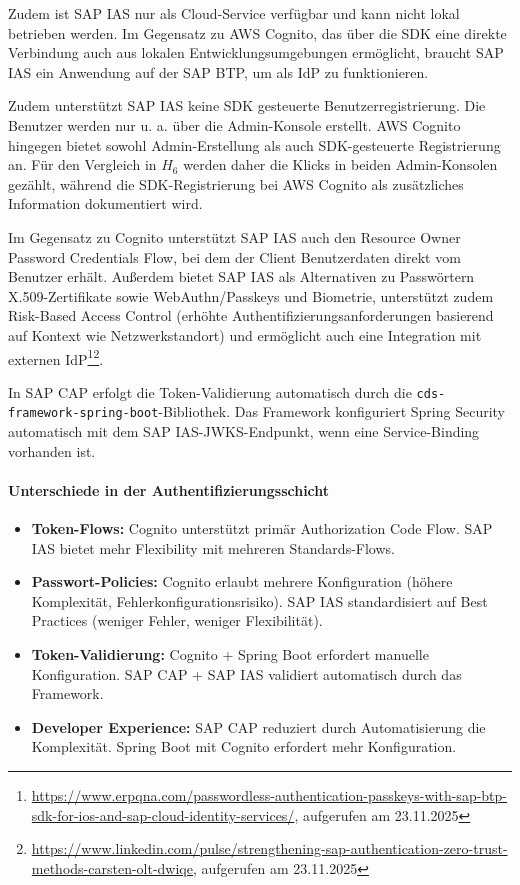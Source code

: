 Zudem ist \ac{SAP IAS} nur als Cloud-Service verfügbar und kann nicht lokal betrieben werden. Im Gegensatz zu \ac{AWS} Cognito, das über die \ac{SDK} eine direkte Verbindung auch aus lokalen Entwicklungsumgebungen ermöglicht, braucht \ac{SAP IAS} ein Anwendung auf der \ac{SAP BTP}, um als \ac{IdP} zu funktionieren.

Zudem unterstützt \ac{SAP IAS} keine \ac{SDK} gesteuerte Benutzerregistrierung. Die Benutzer werden nur u. a. über die Admin-Konsole erstellt. \ac{AWS} Cognito hingegen bietet sowohl Admin-Erstellung als auch SDK-gesteuerte Registrierung an. Für den Vergleich in $H_6$ werden daher die Klicks in beiden Admin-Konsolen gezählt, während die SDK-Registrierung bei \ac{AWS} Cognito als zusätzliches Information dokumentiert wird.

Im Gegensatz zu Cognito unterstützt \ac{SAP IAS} auch den Resource Owner Password Credentials Flow, bei dem der Client Benutzerdaten direkt vom Benutzer erhält.
Außerdem bietet \ac{SAP IAS} als Alternativen zu Passwörtern X.509-Zertifikate sowie WebAuthn/Passkeys und Biometrie, unterstützt zudem Risk-Based Access Control (erhöhte Authentifizierungsanforderungen basierend auf Kontext wie Netzwerkstandort) und ermöglicht auch eine Integration mit externen \ac{IdP}\footnote{\url{https://www.erpqna.com/passwordless-authentication-passkeys-with-sap-btp-sdk-for-ios-and-sap-cloud-identity-services/}, aufgerufen am 23.11.2025}\footnote{\url{https://www.linkedin.com/pulse/strengthening-sap-authentication-zero-trust-methods-carsten-olt-dwiqe}, aufgerufen am 23.11.2025}.

In \ac{SAP CAP} erfolgt die Token-Validierung automatisch durch die \texttt{cds-framework-spring-boot}-Bibliothek. Das Framework konfiguriert Spring Security automatisch mit dem \ac{SAP IAS}-JWKS-Endpunkt, wenn eine Service-Binding vorhanden ist.

\paragraph{Unterschiede in der Authentifizierungsschicht}

\begin{itemize}
    \item \textbf{Token-Flows:} Cognito unterstützt primär Authorization Code Flow. \ac{SAP IAS} bietet mehr Flexibility mit mehreren Standards-Flows.

    \item \textbf{Passwort-Policies:} Cognito erlaubt mehrere Konfiguration (höhere Komplexität, Fehlerkonfigurationsrisiko). \ac{SAP IAS} standardisiert auf Best Practices (weniger Fehler, weniger Flexibilität).

    \item \textbf{Token-Validierung:} Cognito + Spring Boot erfordert manuelle Konfiguration. \ac{SAP CAP} + \ac{SAP IAS} validiert automatisch durch das Framework.

    \item \textbf{Developer Experience:} \ac{SAP CAP} reduziert durch Automatisierung die Komplexität. Spring Boot mit Cognito erfordert mehr Konfiguration.
\end{itemize}
